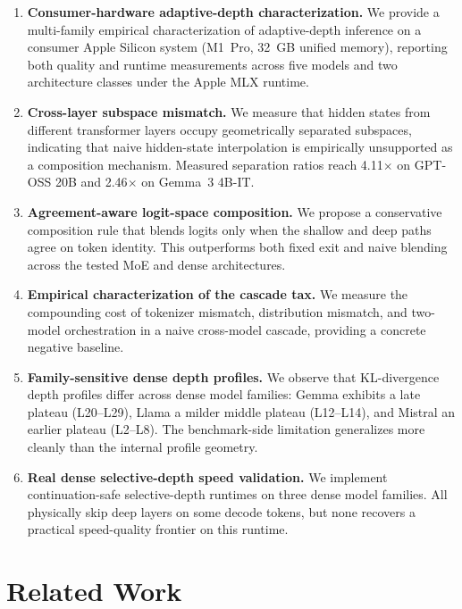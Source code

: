 \documentclass[11pt]{article}
\begin{document}
\begin{enumerate}
\item \textbf{Consumer-hardware adaptive-depth characterization.} We provide a multi-family empirical characterization of adaptive-depth inference on a consumer Apple Silicon system (M1~Pro, 32~GB unified memory), reporting both quality and runtime measurements across five models and two architecture classes under the Apple MLX runtime.

\item \textbf{Cross-layer subspace mismatch.} We measure that hidden states from different transformer layers occupy geometrically separated subspaces, indicating that naive hidden-state interpolation is empirically unsupported as a composition mechanism. Measured separation ratios reach 4.11$\times$ on GPT-OSS 20B and 2.46$\times$ on Gemma~3 4B-IT.

\item \textbf{Agreement-aware logit-space composition.} We propose a conservative composition rule that blends logits only when the shallow and deep paths agree on token identity. This outperforms both fixed exit and naive blending across the tested MoE and dense architectures.

\item \textbf{Empirical characterization of the cascade tax.} We measure the compounding cost of tokenizer mismatch, distribution mismatch, and two-model orchestration in a naive cross-model cascade, providing a concrete negative baseline.

\item \textbf{Family-sensitive dense depth profiles.} We observe that KL-divergence depth profiles differ across dense model families: Gemma exhibits a late plateau (L20--L29), Llama a milder middle plateau (L12--L14), and Mistral an earlier plateau (L2--L8). The benchmark-side limitation generalizes more cleanly than the internal profile geometry.

\item \textbf{Real dense selective-depth speed validation.} We implement continuation-safe selective-depth runtimes on three dense model families. All physically skip deep layers on some decode tokens, but none recovers a practical speed-quality frontier on this runtime.
\end{enumerate}

\section{Related Work}
\end{document}
